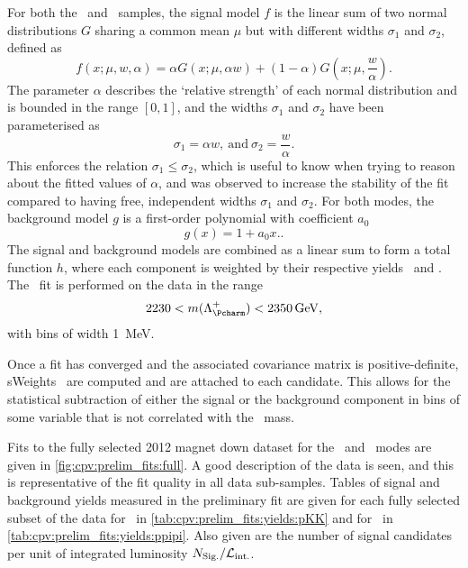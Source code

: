 For both the \pKK\ and \ppipi\ samples, the signal model $f$ is the linear sum 
of two normal distributions $G$ sharing a common mean $\mu$ but with different 
widths $\sigma_{1}$ and $\sigma_{2}$, defined as
\begin{equation}
  f(x; \mu, w, \alpha) = \alpha{}G(x; \mu, \alpha{w}) +
    (1 - \alpha)G(x; \mu, \frac{w}{\alpha}).
  \label{eqn:cpv:prelim_fits:sig_model}
\end{equation}
The parameter $\alpha$ describes the `relative strength' of each normal 
distribution and is bounded in the range $[0, 1]$, and the widths $\sigma_{1}$ 
  and $\sigma_{2}$ have been parameterised as
\begin{equation}
  \sigma_{1} = \alpha{w},\ \text{and}\ \sigma_{2} = \frac{w}{\alpha}.
  \label{eqn:cpv:prelim_fits:sigma_def}
\end{equation}
This enforces the relation $\sigma_{1} \leq \sigma_{2}$, which is useful to 
know when trying to reason about the fitted values of $\alpha$, and was 
observed to increase the stability of the fit compared to having free, 
independent widths $\sigma_{1}$ and $\sigma_{2}$.
For both modes, the background model $g$ is a first-order polynomial with 
coefficient $a_{0}$
\begin{equation}
  g(x) = 1 + a_{0}x.
  \label{eqn:cpv:prelim_fits:bkg_model}.
\end{equation}
The signal and background models are combined as a linear sum to form a total 
function $h$, where each component is weighted by their respective yields 
\nsig\ and \nbkg.
The \chisq\ fit is performed on the data in the range
\begin{equation}
  2230 < m(\PLambdac) < \SI{2350}{\GeV},
\end{equation}
with bins of width \SI{1}{\MeV}.

Once a fit has converged and the associated covariance matrix is 
positive-definite, sWeights~\cite{Pivk:2004ty} are computed and are attached to 
each candidate.
This allows for the statistical subtraction of either the signal or the 
background component in bins of some variable that is not correlated with the 
\PLambdac\ mass.

Fits to the fully selected 2012 magnet down dataset for the \pKK\ and \ppipi\ 
modes are given in \cref{fig:cpv:prelim_fits:full}.
A good description of the data is seen, and this is representative of the fit 
quality in all data sub-samples.
Tables of signal and background yields measured in the preliminary fit are 
given for each fully selected subset of the data for \pKK\ in 
\cref{tab:cpv:prelim_fits:yields:pKK} and for \ppipi\ in 
\cref{tab:cpv:prelim_fits:yields:ppipi}.
Also given are the number of signal candidates per unit of integrated 
luminosity $N_{\text{Sig.}}/\mathcal{L}_{\textnormal{int.}}$.


